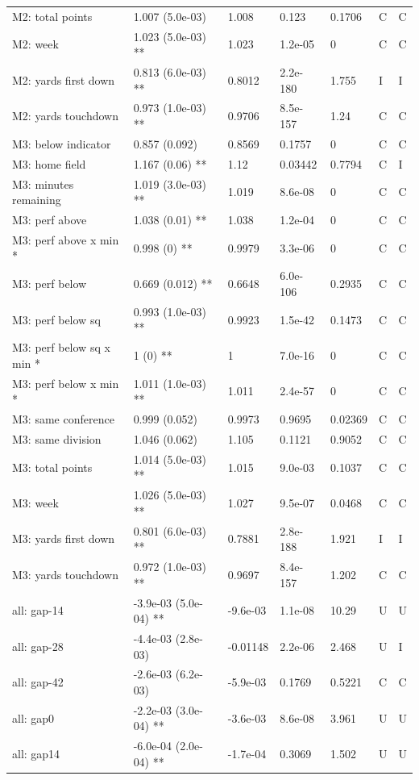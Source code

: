 {\begin{longtable}{@{}p{.245\linewidth}p{.17\linewidth}p{.17\linewidth}p{.085\linewidth}p{.060\linewidth}p{.08\linewidth}p{.07\linewidth}@{}}
M2: total points & 1.007 (5.0e-03) & 1.008 & 0.123 & 0.1706 & C & C\\
M2: week & 1.023 (5.0e-03) ** & 1.023 & 1.2e-05 & 0 & C & C\\
M2: yards first down & 0.813 (6.0e-03) ** & 0.8012 & 2.2e-180 & 1.755 & I & I\\
M2: yards touchdown & 0.973 (1.0e-03) ** & 0.9706 & 8.5e-157 & 1.24 & C & C\\
M3: below indicator & 0.857 (0.092) & 0.8569 & 0.1757 & 0 & C & C\\
M3: home field & 1.167 (0.06) ** & 1.12 & 0.03442 & 0.7794 & C & I\\
M3: minutes remaining & 1.019 (3.0e-03) ** & 1.019 & 8.6e-08 & 0 & C & C\\
M3: perf above & 1.038 (0.01) ** & 1.038 & 1.2e-04 & 0 & C & C\\
M3: perf above x min * & 0.998 (0) ** & 0.9979 & 3.3e-06 & 0 & C & C\\
M3: perf below & 0.669 (0.012) ** & 0.6648 & 6.0e-106 & 0.2935 & C & C\\
M3: perf below sq & 0.993 (1.0e-03) ** & 0.9923 & 1.5e-42 & 0.1473 & C & C\\
M3: perf below sq x min * & 1 (0) ** & 1 & 7.0e-16 & 0 & C & C\\
M3: perf below x min * & 1.011 (1.0e-03) ** & 1.011 & 2.4e-57 & 0 & C & C\\
M3: same conference & 0.999 (0.052) & 0.9973 & 0.9695 & 0.02369 & C & C\\
M3: same division & 1.046 (0.062) & 1.105 & 0.1121 & 0.9052 & C & C\\
M3: total points & 1.014 (5.0e-03) ** & 1.015 & 9.0e-03 & 0.1037 & C & C\\
M3: week & 1.026 (5.0e-03) ** & 1.027 & 9.5e-07 & 0.0468 & C & C\\
M3: yards first down & 0.801 (6.0e-03) ** & 0.7881 & 2.8e-188 & 1.921 & I & I\\
M3: yards touchdown & 0.972 (1.0e-03) ** & 0.9697 & 8.4e-157 & 1.202 & C & C\\
all: gap-14 & -3.9e-03 (5.0e-04) ** & -9.6e-03 & 1.1e-08 & 10.29 & U & U\\
all: gap-28 & -4.4e-03 (2.8e-03) & -0.01148 & 2.2e-06 & 2.468 & U & I\\
all: gap-42 & -2.6e-03 (6.2e-03) & -5.9e-03 & 0.1769 & 0.5221 & C & C\\
all: gap0 & -2.2e-03 (3.0e-04) ** & -3.6e-03 & 8.6e-08 & 3.961 & U & U\\
all: gap14 & -6.0e-04 (2.0e-04) ** & -1.7e-04 & 0.3069 & 1.502 & U & U\\

\end{longtable}}

